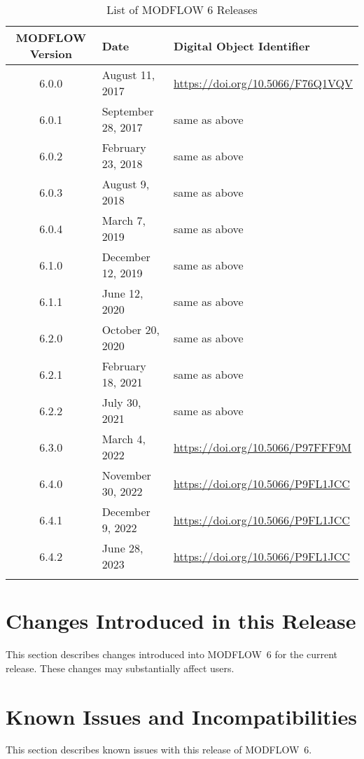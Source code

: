 \documentclass[11pt,twoside,twocolumn]{usgsreport}
\begin{document}
\begin{table}[h]
\begin{center}
\caption{List of MODFLOW 6 Releases}
\small 
\begin{tabular*}{13cm}{cll}
\hline
\hline
\textbf{MODFLOW Version} & \textbf{Date} & \textbf{Digital Object Identifier}\\
\hline
6.0.0 & August 11, 2017 & \url{https://doi.org/10.5066/F76Q1VQV} \\
6.0.1 & September 28, 2017 & same as above \\
6.0.2 & February 23, 2018 & same as above \\
6.0.3 & August 9, 2018 & same as above \\
6.0.4 & March 7, 2019 & same as above \\
6.1.0 & December 12, 2019 & same as above \\
6.1.1 & June 12, 2020 & same as above \\
6.2.0 & October 20, 2020 & same as above \\
6.2.1 & February 18, 2021 & same as above \\
6.2.2 & July 30, 2021 & same as above \\
6.3.0 & March 4, 2022 & \url{https://doi.org/10.5066/P97FFF9M} \\
6.4.0 & November 30, 2022 & \url{https://doi.org/10.5066/P9FL1JCC} \\
6.4.1 & December 9, 2022 & \url{https://doi.org/10.5066/P9FL1JCC} \\
6.4.2 & June 28, 2023 & \url{https://doi.org/10.5066/P9FL1JCC} \\
\hline
\label{tab:releases}
\end{tabular*}
\end{center}
\normalsize
\end{table}


\section{Changes Introduced in this Release}
This section describes changes introduced into MODFLOW~6 for the current release.  These changes may substantially affect users.

\begin{itemize}

\end{itemize}

\section{Known Issues and Incompatibilities}
This section describes known issues with this release of MODFLOW~6.  
\end{document}
